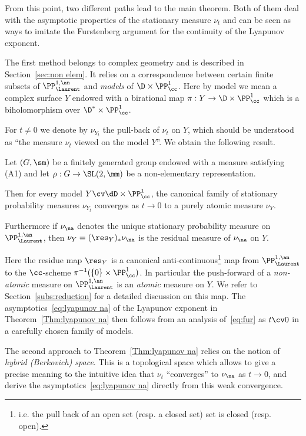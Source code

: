 
From this point, two different paths lead to the main theorem. Both of them deal with the asymptotic properties of the stationary measure $\nu_t$ and can be seen as ways to imitate the Furstenberg argument for the continuity of the Lyapunov exponent.


The first method belongs to complex geometry and is described in Section~\ref{sec:non elem}. It relies on a correspondence between certain finite subsets of $\PP^{1,\an}_{\Laurent}$ and \emph{models} of $\D \times \PP^1_\cc $. Here by model we mean a complex surface $Y$ endowed with a birational map $\pi: Y \to \D \times \PP^1_\cc$ which is a biholomorphism over $\D^*\times \PP^1_\cc$.

For $t\neq 0$ we denote by $\nu_{Y_t}$ the pull-back of $\nu_t$ on $Y$, which should be understood as ``the measure $\nu_t$ viewed on the model $Y$''. We obtain the following result.

\begin{mthm}\label{Thm:atomic}
Let $(G, \sm)$ be a finitely generated group endowed with a measure satisfying (A1) and let $\rho: G\to \SL(2, \mm)$ be a non-elementary representation.

Then for every model $Y\cv \dD\times \PP^1_\cc$, the canonical family of stationary probability measures $\nu_{Y_t}$ converges as $t\to 0$ to a purely atomic measure $\nu_{Y}$.

Furthermore if $\nu_\na$ denotes the unique stationary probability measure on $\PP^{1,\an}_{\Laurent}$, then $\nu_Y = (\res_Y)_*\nu_\na$ is the residual measure of $\nu_\na$ on $Y$.
\end{mthm}

Here the residue map $\res_Y$ is a canonical anti-continuous\footnote{i.e. the pull back of an open set (resp. a closed set) set is closed (resp. open).} map from $\PP^{1,\an}_{\Laurent}$ to the $\cc$-scheme $\pi^{-1}(\{ 0 \} \times \PP^1_\cc)$. In particular the push-forward of a \emph{non-atomic} measure on $\PP^{1,\an}_{\Laurent}$ is an \emph{atomic} measure on $Y$. We refer to Section~\ref{subs:reduction} for a detailed discussion on this map. The asymptotics~\eqref{eq:lyapunov na} of the Lyapunov exponent in Theorem~\ref{Thm:lyapunov na} then follows from an analysis of~\eqref{eq:fur} as $t\cv 0$ in a carefully chosen family of models.


The second approach to Theorem~\ref{Thm:lyapunov na} relies on the notion of \emph{hybrid (Berkovich) space}. This is a topological space which allows to give a precise meaning to the intuitive idea that $\nu_t$ ``converges'' to $\nu_\na$ as $t\to 0$, and derive the asymptotics~\eqref{eq:lyapunov na} directly from this weak convergence.

